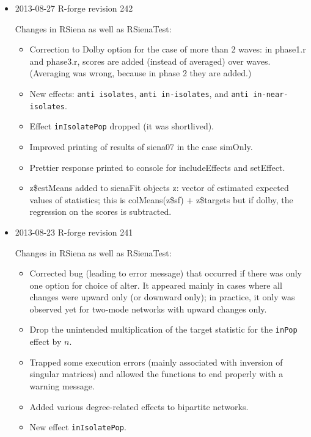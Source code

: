 \documentclass[a4paper,fleqn,11pt]{article}
\newcommand{\+}{\, + \,}
\newcommand{\sfn}[1]{\textsf{#1}}
\begin{document}
\begin{small}
\begin{itemize}
\item 2013-08-27 R-forge revision 242

Changes in \textsf{RSiena} as well as \textsf{RSienaTest}:
  \begin{itemize}
  \item Correction to Dolby option for the case of more than 2 waves:
     in \sfn{phase1.r} and \sfn{phase3.r}, scores are added
     (instead of averaged) over waves.
     (Averaging was wrong, because in phase 2 they are added.)
  \item New effects: \texttt{anti isolates}, \texttt{anti in-isolates},
   and \texttt{anti in-near-isolates}.
  \item Effect \texttt{inIsolatePop} dropped (it was shortlived).
  \item Improved printing of results of \sfn{siena07} in the case
    \sfn{simOnly}.
  \item Prettier response printed to console for \sfn{includeEffects} and
        \sfn{setEffect}.
  \item \sfn{z\$estMeans} added to sienaFit objects \sfn{z}:
     vector of estimated expected values of statistics;
	 this is \sfn{colMeans(z\$sf) + z\$targets}  but if dolby,
	 the regression on the scores is subtracted.
  \end{itemize}


\item 2013-08-23 R-forge revision 241

Changes in \textsf{RSiena} as well as \textsf{RSienaTest}:
  \begin{itemize}
  \item Corrected bug (leading to error message)
     that occurred if there was only one option
     for choice of alter. It appeared mainly in cases where all changes
     were upward only (or downward only); in practice, it only was observed
     yet for two-mode networks with upward changes only.
  \item  Drop the unintended multiplication of the target statistic
     for the \texttt{inPop} effect by $n$.
  \item Trapped some execution errors (mainly associated with inversion of
    singular matrices) and allowed the functions to end properly
    with a warning message.
  \item Added various degree-related effects to bipartite networks.
  \item New effect \texttt{inIsolatePop}.
  \end{itemize}


\end{itemize}
\end{small}
\end{document}
